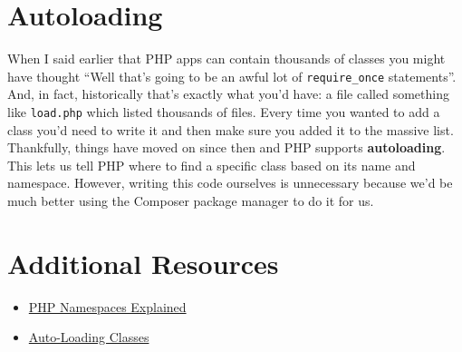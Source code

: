 \section{Autoloading}

When I said earlier that PHP apps can contain thousands of classes you might have thought ``Well that's going to be an awful lot of \texttt{require\_once} statements''. And, in fact, historically that's exactly what you'd have: a file called something like \texttt{load.php} which listed thousands of files. Every time you wanted to add a class you'd need to write it and then make sure you added it to the massive list.
\\

Thankfully, things have moved on since then and PHP supports \textbf{autoloading}. This lets us tell PHP where to find a specific class based on its name and namespace. However, writing this code ourselves is unnecessary because we'd be much better using the Composer package manager to do it for us.

\section{Additional Resources}

\begin{itemize}[leftmargin=*]
    \item \href{https://daylerees.com/php-namespaces-explained/}{PHP Namespaces Explained}
    \item \href{http://php.net/manual/en/language.oop5.autoload.php}{Auto-Loading Classes}
\end{itemize}
